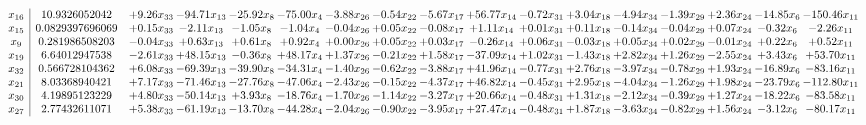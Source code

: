 \documentclass[9pt]{article}
\begin{document}
 \[\begin{array}{c| c c@{\hskip 2pt} c@{\hskip 2pt} c@{\hskip 2pt} c@{\hskip 2pt} c@{\hskip 2pt} c@{\hskip 2pt} c@{\hskip 2pt} c@{\hskip 2pt} c@{\hskip 2pt} c@{\hskip 2pt} c@{\hskip 2pt} c@{\hskip 2pt} c@{\hskip 2pt} c@{\hskip 2pt} c@{\hskip 2pt} }
 x_{16}   &  10.9326052042 & +  9.26 x_{33} & -94.71 x_{13} & -25.92 x_{8} & -75.00 x_{4} & -3.88 x_{26} & -0.54 x_{22} & -5.67 x_{17} & + 56.77 x_{14} & -0.72 x_{31} & +  3.04 x_{18} & -4.94 x_{34} & -1.39 x_{29} & +  2.36 x_{24} & -14.85 x_{6} & -150.46 x_{11}\\
 x_{15}   &  0.0829397696069 & +  0.15 x_{33} & -2.11 x_{13} & -1.05 x_{8} & -1.04 x_{4} & -0.04 x_{26} & +  0.05 x_{22} & -0.08 x_{17} & +  1.11 x_{14} & +  0.01 x_{31} & +  0.11 x_{18} & -0.14 x_{34} & -0.04 x_{29} & +  0.07 x_{24} & -0.32 x_{6} & -2.26 x_{11}\\
 x_{9}   &  0.281986508203 & -0.04 x_{33} & +  0.63 x_{13} & +  0.61 x_{8} & +  0.92 x_{4} & +  0.00 x_{26} & +  0.05 x_{22} & +  0.03 x_{17} & -0.26 x_{14} & +  0.06 x_{31} & -0.03 x_{18} & +  0.05 x_{34} & +  0.02 x_{29} & -0.01 x_{24} & +  0.22 x_{6} & +  0.52 x_{11}\\
 x_{19}   &  6.64012947538 & -2.61 x_{33} & + 48.15 x_{13} & -0.36 x_{8} & + 48.17 x_{4} & +  1.37 x_{26} & -0.21 x_{22} & +  1.58 x_{17} & -37.09 x_{14} & +  1.02 x_{31} & -1.43 x_{18} & +  2.82 x_{34} & +  1.26 x_{29} & -2.55 x_{24} & +  3.43 x_{6} & + 53.70 x_{11}\\
 x_{32}   &  0.566728104362 & +  6.08 x_{33} & -69.39 x_{13} & -39.90 x_{8} & -34.31 x_{4} & -1.40 x_{26} & -0.62 x_{22} & -3.88 x_{17} & + 41.96 x_{14} & -0.77 x_{31} & +  2.76 x_{18} & -3.97 x_{34} & -0.78 x_{29} & +  1.93 x_{24} & -16.89 x_{6} & -83.16 x_{11}\\
 x_{21}   &  8.03368940421 & +  7.17 x_{33} & -71.46 x_{13} & -27.76 x_{8} & -47.06 x_{4} & -2.43 x_{26} & -0.15 x_{22} & -4.37 x_{17} & + 46.82 x_{14} & -0.45 x_{31} & +  2.95 x_{18} & -4.04 x_{34} & -1.26 x_{29} & +  1.98 x_{24} & -23.79 x_{6} & -112.80 x_{11}\\
 x_{30}   &  4.19895123229 & +  4.80 x_{33} & -50.14 x_{13} & +  3.93 x_{8} & -18.76 x_{4} & -1.70 x_{26} & -1.14 x_{22} & -3.27 x_{17} & + 20.66 x_{14} & -0.48 x_{31} & +  1.31 x_{18} & -2.12 x_{34} & -0.39 x_{29} & +  1.27 x_{24} & -18.22 x_{6} & -83.58 x_{11}\\
 x_{27}   &  2.77432611071 & +  5.38 x_{33} & -61.19 x_{13} & -13.70 x_{8} & -44.28 x_{4} & -2.04 x_{26} & -0.90 x_{22} & -3.95 x_{17} & + 27.47 x_{14} & -0.48 x_{31} & +  1.87 x_{18} & -3.63 x_{34} & -0.82 x_{29} & +  1.56 x_{24} & -3.12 x_{6} & -80.17 x_{11}\\

\end{array}\]
\end{document}
